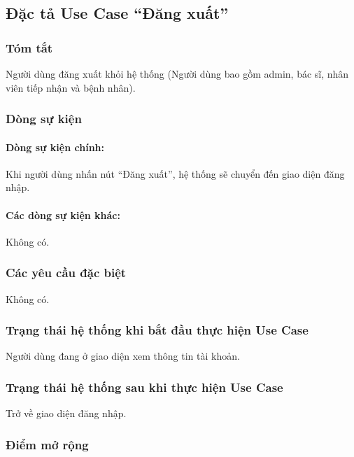 \subsection{Đặc tả Use Case ``Đăng xuất''}

\subsubsection{Tóm tắt}
Người dùng đăng xuất khỏi hệ thống (Người dùng bao gồm admin, bác sĩ, nhân viên tiếp nhận và bệnh nhân).

\subsubsection{Dòng sự kiện}
\paragraph{\textbf{Dòng sự kiện chính:}}
Khi người dùng nhấn nút ``Đăng xuất'', hệ thống sẽ chuyển đến giao diện đăng nhập.

\paragraph{\textbf{Các dòng sự kiện khác:}}
Không có.

\subsubsection{Các yêu cầu đặc biệt}
Không có.

\subsubsection{Trạng thái hệ thống khi bắt đầu thực hiện Use Case}
Người dùng đang ở giao diện xem thông tin tài khoản.

\subsubsection{Trạng thái hệ thống sau khi thực hiện Use Case}
Trở về giao diện đăng nhập.

\subsubsection{Điểm mở rộng}